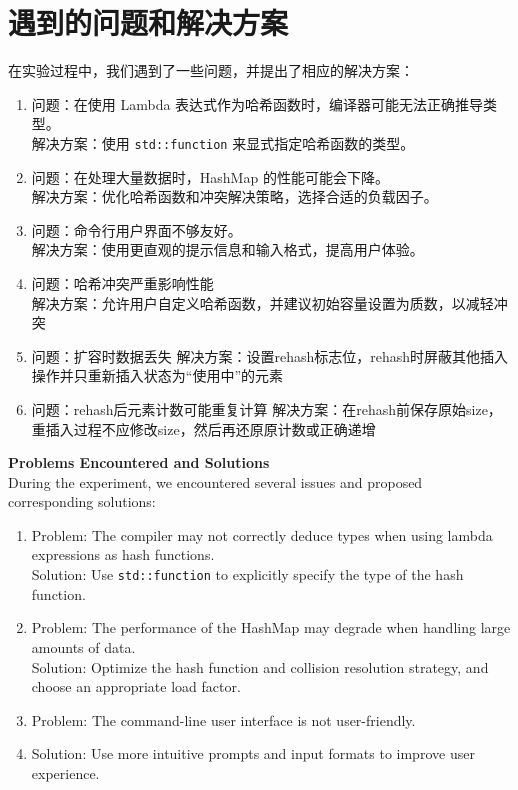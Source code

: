 \documentclass{article}
\begin{document}
\section{遇到的问题和解决方案}%
    在实验过程中，我们遇到了一些问题，并提出了相应的解决方案：
    \begin{enumerate}
        \item 问题：在使用 Lambda 表达式作为哈希函数时，编译器可能无法正确推导类型。\\
        解决方案：使用 \texttt{std::function} 来显式指定哈希函数的类型。
        \item 问题：在处理大量数据时，HashMap 的性能可能会下降。\\
        解决方案：优化哈希函数和冲突解决策略，选择合适的负载因子。
        \item 问题：命令行用户界面不够友好。\\
        解决方案：使用更直观的提示信息和输入格式，提高用户体验。
        \item 问题：哈希冲突严重影响性能\\
        解决方案：允许用户自定义哈希函数，并建议初始容量设置为质数，以减轻冲突
        \item 问题：扩容时数据丢失
        解决方案：设置rehash标志位，rehash时屏蔽其他插入操作并只重新插入状态为“使用中”的元素
        \item 问题：rehash后元素计数可能重复计算
        解决方案：在rehash前保存原始size，重插入过程不应修改size，然后再还原原计数或正确递增
    \end{enumerate}
    \bigskip

    \textbf{Problems Encountered and Solutions}\\
    During the experiment, we encountered several issues and proposed corresponding solutions:
    \begin{enumerate}
        \item Problem: The compiler may not correctly deduce types when using lambda expressions as hash functions.\\
        Solution: Use \texttt{std::function} to explicitly specify the type of the hash function.
        \item Problem: The performance of the HashMap may degrade when handling large amounts of data.\\
        Solution: Optimize the hash function and collision resolution strategy, and choose an appropriate load factor.
        \item Problem: The command-line user interface is not user-friendly.\\
        \item Solution: Use more intuitive prompts and input formats to improve user experience.
    \end{enumerate}
\end{document}
